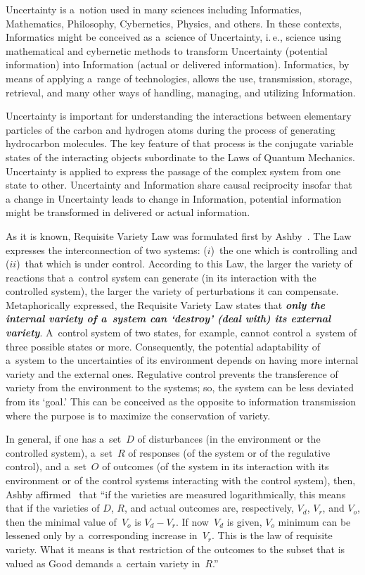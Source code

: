 \begin{multicols}{2}
Uncertainty is a~notion used in many sciences including Informatics, Mathematics, Philosophy, 
Cybernetics, Physics, and others. In these contexts, Informatics might be conceived 
as a~science 
of Uncertainty, i.\,e., science using mathematical and cybernetic methods to transform 
Uncertainty (potential information) into Information (actual or delivered information). 
Informatics, by means of applying a~range of technologies, allows the use, transmission, storage, 
retrieval, and many other ways of handling, managing, and utilizing Information.

Uncertainty is important for understanding the interactions between elementary particles of the 
carbon and hydrogen atoms during the process of generating hydrocarbon molecules. The key 
feature of that process is the conjugate variable states of the interacting objects subordinate to the 
Laws of Quantum Mechanics. Uncertainty is applied to express the passage of the complex 
system from one state to other. Uncertainty and Information share causal reciprocity insofar that 
a change in Uncertainty leads to change in Information, potential information might be 
transformed in delivered or actual information. 

As it is known, Requisite Variety Law was formulated first by Ashby~\cite{20-sel}.  The Law expresses 
the interconnection of two systems: ($i$)~the one which is controlling and ($ii$)~that which is under 
control.  According to this Law, the larger the variety of reactions that a~control system can 
generate (in its interaction with the controlled system), the larger the variety of perturbations it 
can compensate.  Metaphorically expressed, the Requisite Variety Law states that 
{\bfseries\textit{only the internal variety of a~system can `destroy' (deal with) its external 
variety}}. A~control system of two states, for example, cannot control a~system of three possible 
states or more. Consequently, the potential adaptability of a~system to the uncertainties of its 
environment depends on having more internal variety and the external ones. Regulative control 
prevents the transference of variety from the environment to the systems; so, the system can be 
less deviated from its `goal.' This can be conceived as the opposite to information transmission 
where the purpose is to maximize the conservation of variety. 

In general, if one has a~set~$D$ of disturbances (in the environment or the controlled system), 
a~set~$R$ of responses (of the system or of the regulative control), and a~set~$O$ 
of outcomes (of the 
system in its interaction with its environment or of the control systems 
interacting with the 
control system), then, Ashby affirmed~\cite[p.~47]{20-sel} that 
``if the varieties are measured logarithmically, this means that if the varieties of 
$D$, $R$, and actual outcomes are, respectively, $V_d$, $V_r$, and $V_o$, then the minimal value 
of~$V_o$ is $V_d -V_r$. If now~$V_d$ is given, $V_o$ minimum can be lessened only by 
a~corresponding increase in~$V_r$. This is the law of requisite variety. What it 
means is that restriction of the outcomes to the subset that is valued as Good 
demands a~certain variety in~$R$.''


\end{multicols}

